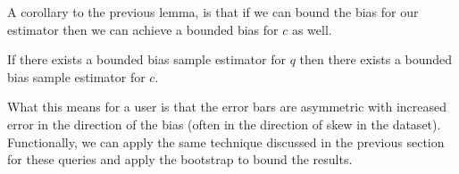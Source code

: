 A corollary to the previous lemma, is that if we can bound the bias for our estimator then we can achieve a bounded bias for $c$ as well.
\begin{corollary}
If there exists a bounded bias sample estimator for $q$ then there exists a bounded bias sample estimator for $c$.
\end{corollary}

What this means for a user is that the error bars are asymmetric with increased error in the direction of the bias (often in the direction of skew in the dataset).
Functionally, we can apply the same technique discussed in the previous section for these queries and apply the bootstrap to bound the results. 
\fi

\iffalse 

\subsection{Query Execution Cost}
It is true that \svc adds to the query execution time by issuing a correction. 
However, this correction is only calculated on a sample and thus is small compared to the query execution time over the entire old view.
In our experiments, we show that the overheads are small in comparison to the execution time over the entire old view and the savings from only maintaining a sample (Section \ref{exp-datacube}).
\fi